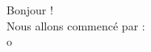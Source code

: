 \documentclass[a4paper,12pt]{report}
\begin{document}
Bonjour !\\
Nous allons commenc\'e  par : \\
o
\end{document}
